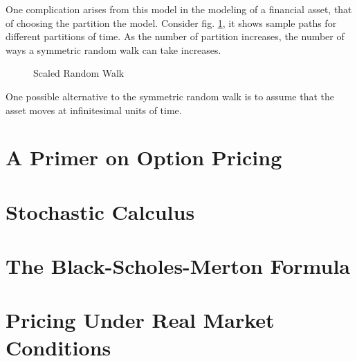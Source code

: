 \documentclass[11pt]{report}
\begin{document}
One complication arises from this model in the modeling of a financial asset, that of choosing the partition the model. Consider fig. \ref{scaled_random_walk}, it shows sample paths for different partitions of time. As the number of partition increases, the number of ways a symmetric random walk can take increases. \\

\begin{figure}[h]
	\label{scaled_random_walk}
	\centering
	
	\caption{Scaled Random Walk}
\end{figure}

One possible alternative to the symmetric random walk is to assume that the asset moves at infinitesimal units of time. 

\chapter{A Primer on Option Pricing}
\chapter{Stochastic Calculus}
\chapter{The Black-Scholes-Merton Formula}
\chapter{Pricing Under Real Market Conditions}

\newpage
\nocite{*}

\end{document}
